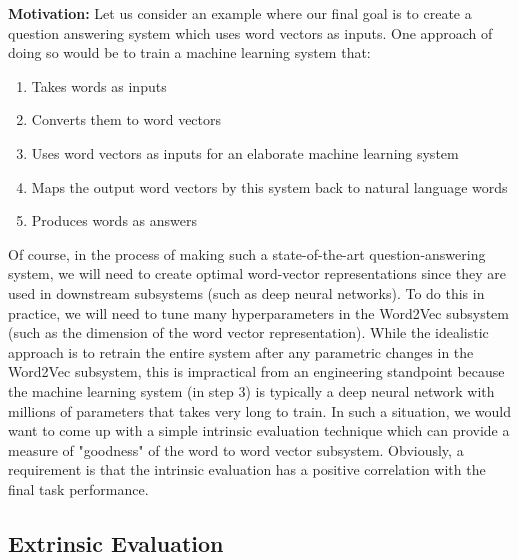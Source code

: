 \documentclass{tufte-handout}
\begin{document}
\textbf{Motivation:} Let us consider an example where our final goal is to create a question answering system which uses word vectors as inputs. One approach of doing so would be to train a machine learning system that:
\begin {enumerate}
\item Takes words as inputs
\item Converts them to word vectors
\item Uses word vectors as inputs for an elaborate machine learning system
\item Maps the output word vectors by this system back to natural language words
\item Produces words as answers
\end{enumerate}


Of course, in the process of making such a state-of-the-art question-answering system, we will need to create optimal word-vector representations since they are used in downstream subsystems (such as deep neural networks). To do this in practice, we will need to tune many hyperparameters in the Word2Vec subsystem (such as the dimension of the word vector representation). While the idealistic approach is to retrain the entire system after any parametric changes in the Word2Vec subsystem, this is impractical from an engineering standpoint because the machine learning system (in step 3) is typically a deep neural network with millions of parameters that takes very long to train. In such a situation, we would want to come up with a simple intrinsic evaluation technique which can provide a measure of "goodness" of the word to word vector subsystem. Obviously, a requirement is that the intrinsic evaluation has a positive correlation with the final task performance.

\subsection{Extrinsic Evaluation}\label{sec:extrinsic}
\end{document}
